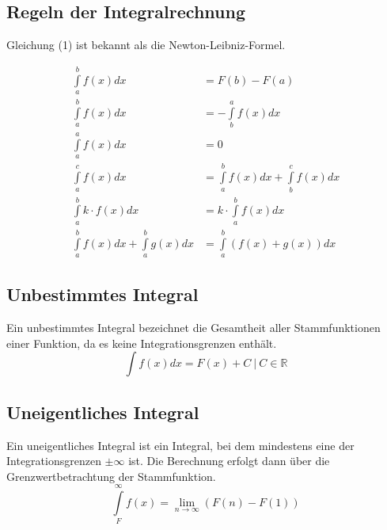 \subsection{Regeln der Integralrechnung}
Gleichung (1) ist bekannt als die Newton-Leibniz-Formel.

\begin{align}
  \int\limits_a^bf(x)dx &= F(b)-F(a) \\
  \int\limits_a^bf(x)dx &= -\int\limits_b^af(x)dx \\
  \int\limits_a^af(x)dx &= 0 \\
  \int\limits_a^cf(x)dx &= \int\limits_a^bf(x)dx + \int\limits_b^cf(x)dx \\
  \int\limits_a^bk\cdot f(x)dx &= k\cdot \int\limits_a^bf(x)dx\\
  \int\limits_a^bf(x)dx + \int\limits_a^bg(x)dx &= \int\limits_a^b(f(x)+g(x))dx
\end{align}


\subsection{Unbestimmtes Integral}
Ein unbestimmtes Integral bezeichnet die Gesamtheit aller Stammfunktionen einer Funktion, da es keine Integrationsgrenzen enthält.
\begin{equation}
  \int f(x)dx=F(x)+C ~|~ C\in\mathbb{R}
\end{equation}

\subsection{Uneigentliches Integral}
Ein uneigentliches Integral ist ein Integral, bei dem mindestens eine der Integrationsgrenzen $\pm\infty$ ist. Die Berechnung erfolgt dann über die Grenzwertbetrachtung der Stammfunktion.
\begin{equation}
  \int\limits_F^\infty f(x) = \lim\limits_{n\rightarrow\infty}(F(n)-F(1))
\end{equation}
